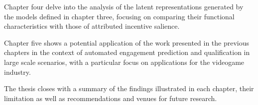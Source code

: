 Chapter four delve into the analysis of the latent representations generated by the models defined in chapter three, focusing on comparing their functional characteristics with those of attributed incentive salience. 

Chapter five shows a potential application of the work presented in the previous chapters in the context of automated engagement prediction and qualification in large scale scenarios, with a particular focus on applications for the videogame industry.

The thesis closes with a summary of the findings illustrated in each chapter, their limitation as well as recommendations and venues for future research.


